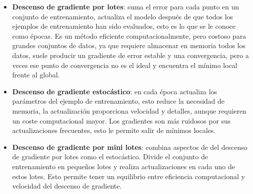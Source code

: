 \begin{itemize}
    \item \textbf{Descenso de gradiente por lotes}: suma el error para cada punto en un conjunto de entrenamiento, actualiza el modelo después de que todos los ejemplos de entrenamiento han sido evaluados, esto es lo que se le conoce como épocas. Es un método eficiente computacionalmente, pero costoso para grandes conjuntos de datos, ya que requiere almacenar en memoria todos los datos, suele producir un gradiente de error estable y una convergencia, pero a veces ese punto de convergencia no es el ideal y encuentra el mínimo local frente al global.
    \item \textbf{Descenso de gradiente estocástico}: en cada época actualiza los parámetros del ejemplo de entrenamiento, esto reduce la necesidad de memoria, la actualización proporciona velocidad y detalles, aunque requieren un coste computacional mayor. Los gradientes son más ruidosos por sus actualizaciones frecuentes, esto le permite salir de mínimos locales.
    \item \textbf{Descenso de gradiente por mini lotes}: combina aspectos de del descenso de gradiente por lotes como el estocástico. Divide el conjunto de entrenamiento en pequeños lotes y realiza actualizaciones en cada uno de estos lotes. Esto permite tener un equilibrio entre eficiencia computacional y velocidad del descenso de gradiente.
\end{itemize}


